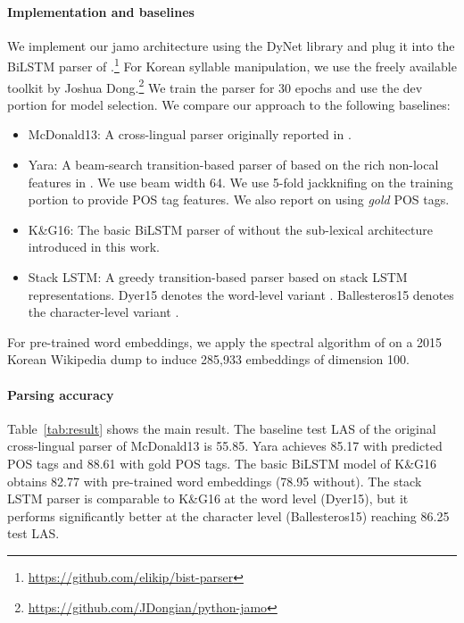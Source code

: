\documentclass[11pt,letterpaper]{article}
\begin{document}
\begin{CJK}{UTF8}{gbsn}
\paragraph{Implementation and baselines}
We implement our jamo architecture using the DyNet library \cite{dynet} and plug it into the BiLSTM parser of .\footnote{\url{https://github.com/elikip/bist-parser}}
For Korean syllable manipulation, we use the freely available toolkit by Joshua Dong.\footnote{\url{https://github.com/JDongian/python-jamo}}
We train the parser for 30 epochs and use the dev portion for model selection.
We compare our approach to the following baselines:
\begin{itemize}
\item McDonald13: A cross-lingual parser originally reported in .
\item Yara: A beam-search transition-based parser of  based on the rich non-local features in .
We use beam width 64. We use 5-fold jackknifing on the training portion to provide POS tag features. We also report on using \textit{gold} POS tags.
\item K\&G16: The basic BiLSTM parser of  without the sub-lexical architecture introduced in this work.
\item Stack LSTM: A greedy transition-based parser based on stack LSTM representations.
  Dyer15 denotes the word-level variant \cite{dyer:2015acl}.
  Ballesteros15 denotes the character-level variant \cite{ballesteros:2015emnlp}.
\end{itemize}
For pre-trained word embeddings, we apply the spectral algorithm of  on a 2015 Korean Wikipedia dump
to induce 285,933 embeddings of dimension 100.

\paragraph{Parsing accuracy}
Table~\ref{tab:result} shows the main result.
The baseline test LAS of the original cross-lingual parser of McDonald13 is 55.85.
Yara achieves 85.17 with predicted POS tags and 88.61 with gold POS tags.
The basic BiLSTM model of K\&G16 obtains 82.77 with pre-trained word embeddings (78.95 without).
The stack LSTM parser is comparable to K\&G16 at the word level (Dyer15), but it performs significantly better at the character level (Ballesteros15) reaching 86.25 test LAS.


\end{CJK}
\end{document}
